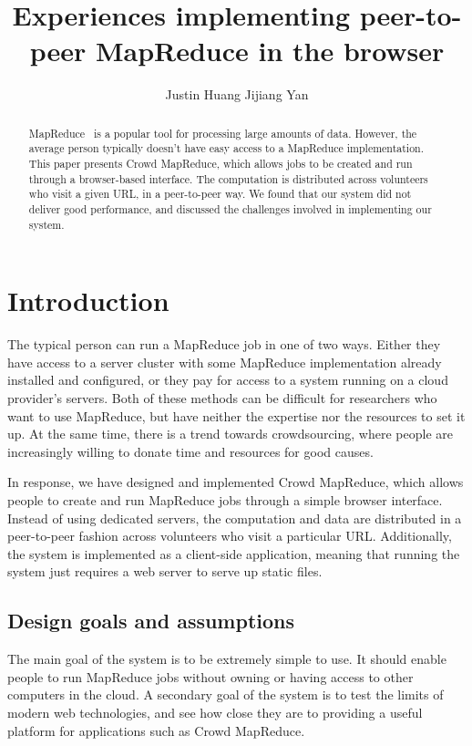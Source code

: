 \documentclass{article} %
\title{Experiences implementing peer-to-peer MapReduce in the browser}
\author{Justin Huang \And Jijiang Yan}
\begin{document}
\maketitle

\begin{abstract}
MapReduce~\cite{dean2008mapreduce} is a popular tool for processing large
amounts of data. However, the average person typically doesn't have easy access
to a MapReduce implementation. This paper presents Crowd MapReduce, which allows
jobs to be created and run through a browser-based interface. The computation is
distributed across volunteers who visit a given URL, in a peer-to-peer way. We
found that our system did not deliver good performance, and discussed the
challenges involved in implementing our system.
\end{abstract}

\section{Introduction}
The typical person can run a MapReduce job in one of two ways. Either they have
access to a server cluster with some MapReduce implementation already installed
and configured, or they pay for access to a system running on a cloud provider's
servers. Both of these methods can be difficult for researchers who want to use
MapReduce, but have neither the expertise nor the resources to set it up. At the
same time, there is a trend towards crowdsourcing, where people are
increasingly willing to donate time and resources for good causes.

In response, we have designed and implemented Crowd MapReduce, which allows
people to create and run MapReduce jobs through a simple browser interface.
Instead of using dedicated servers, the computation and data are distributed in
a peer-to-peer fashion across volunteers who visit a particular URL.
Additionally, the system is implemented as a client-side application, meaning
that running the system just requires a web server to serve up static files.

\subsection{Design goals and assumptions}
The main goal of the system is to be extremely simple to use. It should enable
people to run MapReduce jobs without owning or having access to other computers
in the cloud. A secondary goal of the system is to test the limits of modern web
technologies, and see how close they are to providing a useful platform for
applications such as Crowd MapReduce.
\end{document}
